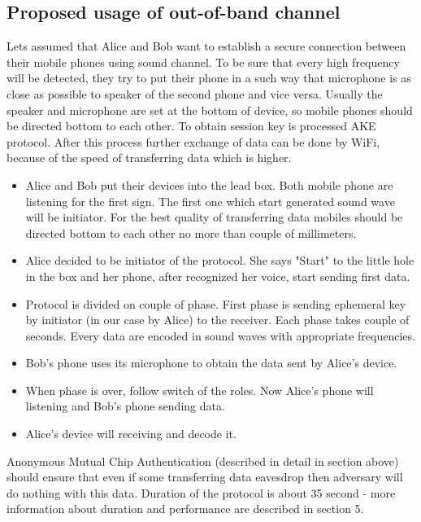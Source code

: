 \documentclass[11pt,titlepage]{article}
\theoremstyle{plain}
\begin{document}
\subsection{Proposed usage of out-of-band channel}

Lets assumed that Alice and Bob want to establish a secure connection between their mobile phones using sound channel. To be sure that every high frequency will be detected, they try to put their phone in a such way that microphone is as close as possible to speaker of the second phone and vice versa. Usually the speaker and microphone are set at the bottom of device, so mobile phones should be directed bottom to each other. To obtain session key is processed AKE protocol. After this process further exchange of data can be done by WiFi, because of the speed of transferring data which is higher. 

\vspace{5mm}

\begin{itemize}
\item Alice and Bob put their devices into the lead box. Both mobile phone are listening for the first sign. The first one which start generated sound wave will be initiator. For the best quality of transferring data mobiles should be directed bottom to each other no more than couple of millimeters.
\item Alice decided to be initiator of the protocol. She says "Start" to the little hole in the box and her phone, after recognized her voice, start sending first data.
\item Protocol is divided on couple of phase. First phase is sending ephemeral key by initiator (in our case by Alice) to the receiver. Each phase takes couple of seconds. Every data are encoded in sound waves with appropriate frequencies.
\item Bob's phone uses its microphone to obtain the data sent by Alice's device.
\item When phase is over, follow switch of the roles. Now Alice's phone will listening and Bob's phone sending data.
\item Alice's device will receiving and decode it.
\end{itemize}

Anonymous Mutual Chip Authentication (described in detail in section above) should ensure that even if some transferring data eavesdrop then adversary will do nothing with this data. Duration of the protocol is about 35 second - more information about duration and performance are described in section 5.
\end{document}
